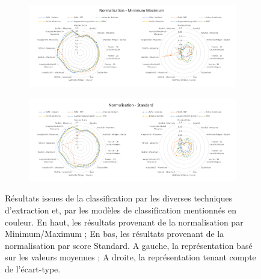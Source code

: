 \begin{figure}[H]
    \centering
    
    \begin{subfigure}{\textwidth}
      \includegraphics[width=\textwidth]{contents/chapter_4/resources/results_image_classification_mms.pdf}
    \end{subfigure}
    
    \begin{subfigure}{\textwidth}
      \includegraphics[width=\textwidth]{contents/chapter_4/resources/results_image_classification_ss.pdf}
    \end{subfigure}
    
    \caption{Résultats issues de la classification par les diverses techniques d'extraction et, par les modèles de classification mentionnés en couleur. En haut, les résultats provenant de la normalisation par Minimum/Maximum ; En bas, les résultats provenant de la normalisation par score Standard. A gauche, la représentation basé sur les valeurs moyennes ; A droite, la représentation tenant compte de l'écart-type.}
    \label{fig:results_image_classification}
\end{figure}\par

